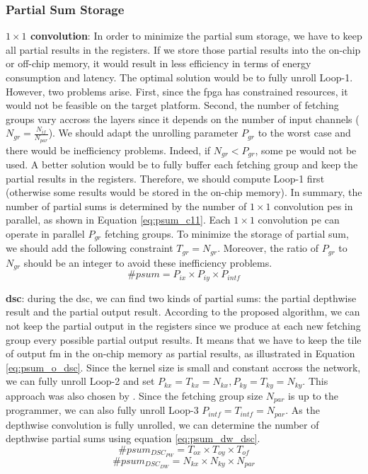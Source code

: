 \subsubsection{Partial Sum Storage}
%
\textbf{$1 \times 1$ convolution}: In order to minimize the partial sum storage, we have to keep all partial results in the registers. If we store those partial results into the on-chip or off-chip memory, it would result in less efficiency in terms of energy consumption and latency. The optimal solution would be to fully unroll Loop-1. However, two problems arise. First, since the \acrshort{fpga} has constrained resources, it would not be feasible on the target platform. Second, the number of fetching groups vary accross the layers since it depends on the number of input channels ($N_{gr} = \frac{N_{if}}{N_{par}}$). We should adapt the unrolling parameter $P_{gr}$ to the worst case and there would be inefficiency problems. Indeed, if $N_{gr} < P_{gr}$, some \acrshort{pe} would not be used. A better solution would be to fully buffer each fetching group and keep the partial results in the registers. Therefore, we should compute Loop-1 first (otherwise some results would be stored in the on-chip memory).
In summary, the number of partial sums is determined by the number of $1 \times 1$ convolution \acrshort{pe}s in parallel, as shown in Equation \eqref{eq:psum_c11}. Each $1 \times 1$ convolution \acrshort{pe} can operate in parallel $P_{gr}$ fetching groups. To minimize the storage of partial sum, we should add the following constraint $T_{gr} = N_{gr}$. Moreover, the ratio of $P_{gr}$ to $N_{gr}$ should be an integer to avoid these inefficiency problems.
%
\begin{equation}
    \# psum = P_{ix} \times P_{iy} \times P_{intf}
    \label{eq:psum_c11}
\end{equation}

\textbf{\acrshort{dsc}}: during the \acrshort{dsc}, we can find two kinds of partial sums: the partial depthwise result and the partial output result. According to the proposed algorithm, we can not keep the partial output in the registers since we produce at each new fetching group every possible partial output results. It means that we have to keep the tile of output \acrshort{fm} in the on-chip memory as partial results, as illustrated in Equation \eqref{eq:psum_o_dsc}. Since the kernel size is small and constant accross the network, we can fully unroll Loop-2 and set $P_{kx} = T_{kx} = N_{kx}, P_{ky} = T_{ky} = N_{ky}$. This approach was also chosen by \textcite{motamedi_placid_2017}. Since the fetching group size $N_{par}$ is up to the programmer, we can also fully unroll Loop-3 $P_{intf} = T_{intf} = N_{par}$. As the depthwise convolution is fully unrolled, we can determine the number of depthwise partial sums using equation \eqref{eq:psum_dw_dsc}.
%
\begin{equation}
    \# psum_{DSC_{PW}} = T_{ox} \times T_{oy} \times T_{of}
    \label{eq:psum_o_dsc}
\end{equation}
%
\begin{equation}
    \# psum_{DSC_{DW}} = N_{kx} \times N_{ky} \times N_{par}
    \label{eq:psum_dw_dsc}
\end{equation}
%
